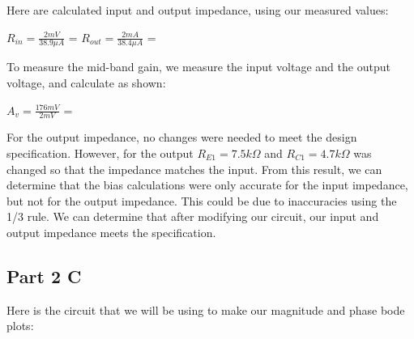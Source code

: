 \documentclass[12pt]{article}
\begin{document}
Here are calculated input and output impedance, using our measured values:
\begin{center}
    $R_{in} = \frac{2mV}{38.9 \mu A}$ = 
    \boxed{51.4 \Omega}       $R_{out} = \frac{2mA}{38.4 \mu A}$ = \boxed{52.1 \Omega}
\end{center}

To measure the mid-band gain, we measure the input voltage and the output voltage, and calculate as shown:

\begin{center}
    $A_v = \frac{176mV}{2mV}$ = 
\end{center}

For the output impedance, no changes were needed to meet the design specification. However, for the output  $R_{E1} = 7.5k\Omega$ and $R_{C1} = 4.7k\Omega$ was changed so that the impedance matches the input.
From this result, we can determine that the bias calculations were only accurate for the input impedance, but not for the output impedance. This could be due to inaccuracies using the 1/3 rule. We can determine that after modifying our circuit, our input and output impedance meets the specification.
\subsection{Part 2 C}

Here is the circuit that we will be using to make our magnitude and phase bode plots:
\end{document}
